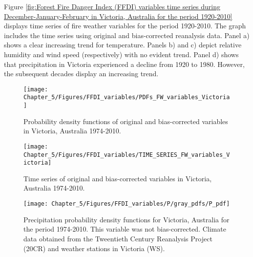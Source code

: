 Figure \ref{fig:Forest Fire Danger Index (FFDI) variables time series during December-January-February in Victoria, Australia for the period 1920-2010}
displays time series of fire weather variables for the period 1920-2010.
The graph includes the time series using original and bias-corrected
reanalysis data. Panel a) shows a clear increasing trend for temperature.
Panels b) and c) depict relative humidity and wind speed (respectively)
with no evident trend. Panel d) shows that precipitation in Victoria
experienced a decline from 1920 to 1980. However, the subsequent decades
display an increasing trend. 

\begin{figure}[H]
\noindent \begin{centering}
\texttt{[image: Chapter\_5/Figures/FFDI\_variables/PDFs\_FW\_variables\_Victoria]}
\par\end{centering}

\caption[Probability density functions of original and bias-corrected variables
in Victoria, Australia 1974-2010]{Probability density functions of original and bias-corrected variables
in Victoria, Australia 1974-2010. \label{fig:Probability density functions of original and bias-corrected variables in Victoria, Australia 1974-2010} }


\end{figure}


\begin{figure}[H]
\noindent \begin{centering}
\texttt{[image: Chapter\_5/Figures/FFDI\_variables/TIME\_SERIES\_FW\_variables\_Victoria]}
\par\end{centering}

\caption[Time series of original and bias-corrected variables in Victoria,
Australia 1974-2010]{Time series of original and bias-corrected variables in Victoria,
Australia 1974-2010. \label{fig:Time series of original and bias-corrected variables in Victoria, Australia 1974-2010} }


\end{figure}


\begin{figure}[H]
\noindent \begin{centering}
\texttt{[image: Chapter\_5/Figures/FFDI\_variables/P/gray\_pdfs/P\_pdf]}
\par\end{centering}

\caption[Precipitation probability density functions for Victoria, Australia
for the period 1974-2010]{Precipitation probability density functions for Victoria, Australia
for the period 1974-2010. This variable was not bias-corrected. Climate
data obtained from the Tweentieth Century Reanalysis Project (20CR)
and weather stations in Victoria (WS). \label{fig:Precipitation probability density functions for Victoria, Australia for the period 1974-2010}}
\end{figure}


